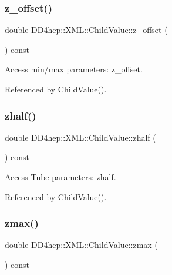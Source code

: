\subsubsection{\texorpdfstring{z\+\_\+offset()}{z\_offset()}}
{\footnotesize\ttfamily double D\+D4hep\+::\+X\+M\+L\+::\+Child\+Value\+::z\+\_\+offset (\begin{DoxyParamCaption}{ }\end{DoxyParamCaption}) const}



Access min/max parameters\+: z\+\_\+offset. 



Referenced by Child\+Value().

\hypertarget{struct_d_d4hep_1_1_x_m_l_1_1_child_value_a2e384dd38cff03a33d0f4715669442c2}{}\label{struct_d_d4hep_1_1_x_m_l_1_1_child_value_a2e384dd38cff03a33d0f4715669442c2} 
\subsubsection{\texorpdfstring{zhalf()}{zhalf()}}
{\footnotesize\ttfamily double D\+D4hep\+::\+X\+M\+L\+::\+Child\+Value\+::zhalf (\begin{DoxyParamCaption}{ }\end{DoxyParamCaption}) const}



Access Tube parameters\+: zhalf. 



Referenced by Child\+Value().

\hypertarget{struct_d_d4hep_1_1_x_m_l_1_1_child_value_a17611f7d94bd97fc62ad6feffc9e8446}{}\label{struct_d_d4hep_1_1_x_m_l_1_1_child_value_a17611f7d94bd97fc62ad6feffc9e8446} 
\subsubsection{\texorpdfstring{zmax()}{zmax()}}
{\footnotesize\ttfamily double D\+D4hep\+::\+X\+M\+L\+::\+Child\+Value\+::zmax (\begin{DoxyParamCaption}{ }\end{DoxyParamCaption}) const}



